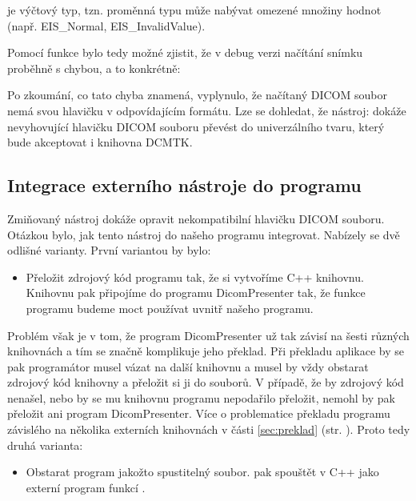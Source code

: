  je výčtový typ, tzn. proměnná typu  může nabývat omezené množiny hodnot (např. EIS\_Normal, EIS\_InvalidValue).

Pomocí funkce  bylo tedy možné zjistit, že v debug verzi načítání snímku proběhně s chybou, a to konkrétně:


Po zkoumání, co tato chyba znamená, vyplynulo, že načítaný DICOM soubor nemá svou hlavičku v odpovídajícím formátu. Lze se dohledat, že nástroj:  dokáže nevyhovující hlavičku DICOM souboru převést do univerzálního tvaru, který bude akceptovat i knihovna DCMTK.

\subsection{Integrace externího nástroje do programu}
Zmiňovaný nástroj  dokáže opravit nekompatibilní hlavičku DICOM souboru. Otázkou bylo, jak tento nástroj do našeho programu integrovat. Nabízely se dvě odlišné varianty. První variantou by bylo:

\begin{itemize}
\item
Přeložit zdrojový kód programu  tak, že si vytvoříme C++ knihovnu. Knihovnu pak připojíme do programu DicomPresenter tak, že funkce programu  budeme moct používat uvnitř našeho programu.
\end{itemize}

Problém však je v tom, že program DicomPresenter už tak závisí na šesti různých knihovnách a tím se značně komplikuje jeho překlad. Při překladu aplikace by se pak programátor musel vázat na další knihovnu a musel by vždy obstarat zdrojový kód knihovny a přeložit si ji do  souborů. V případě, že by zdrojový kód nenašel, nebo by se mu knihovnu programu  nepodařilo přeložit, nemohl by pak přeložit ani program DicomPresenter. Více o problematice překladu programu závislého na několika externích knihovnách v části \ref{sec:preklad} (str. \pageref{sec:preklad}). Proto tedy druhá varianta:

\begin{itemize}
\item
Obstarat program  jakožto spustitelný soubor.  pak spouštět v C++ jako externí program funkcí .
\end{itemize}


